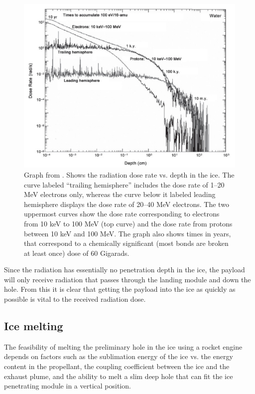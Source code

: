 \begin{figure}
\begin{center}
\includegraphics[scale=0.5]{figures/navtheory/icerad}
\caption{Graph from \cite{Paranicas_2009}. Shows the radiation dose rate vs. depth in the ice. The curve labeled “trailing hemisphere” includes the dose rate of 1–20 MeV electrons only, whereas the curve below it labeled leading hemisphere displays the dose rate of 20–40 MeV electrons. The two uppermost curves show the dose rate corresponding to electrons from 10 keV to 100 MeV (top curve) and the dose rate from protons between 10 keV and 100 MeV. The graph also shows times in years, that correspond to a chemically significant (most bonds
are broken at least once) dose of 60 Gigarads.}
\label{icerad}
\end{center}
\end{figure}

Since the radiation has essentially no penetration depth in the ice, the payload will only receive radiation that passes through the landing module and down the hole. From this it is clear that getting the payload into the ice as quickly as possible is vital to the received radiation dose. 


\subsection{Ice melting}

The feasibility of melting the preliminary hole in the ice using a rocket engine depends on factors such as the sublimation energy of the ice vs. the energy content in the propellant, the coupling coefficient between the ice and the exhaust plume, and the ability to melt a slim deep hole that can fit the ice penetrating module in a vertical position. 

